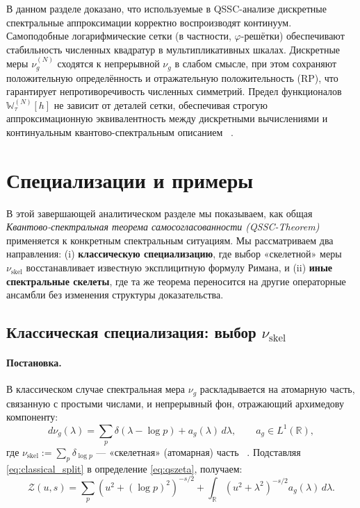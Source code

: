 \documentclass{article}
\numberwithin{equation}{section}
\theoremstyle{plain}
\theoremstyle{definition}
\theoremstyle{remark}
\def\delta{δ}\def\Delta{Δ}\def\epsilon{ε}\def\zeta{ζ}%
\begin{document}
В данном разделе доказано, что используемые в QSSC-анализе дискретные
спектральные аппроксимации корректно воспроизводят континуум.
Самоподобные логарифмические сетки (в частности, $\varphi$-решётки)
обеспечивают стабильность численных квадратур в мультипликативных шкалах.
Дискретные меры $\nu_g^{(N)}$ сходятся к непрерывной $\nu_g$
в слабом смысле, при этом сохраняют положительную определённость и отражательную положительность (RP),
что гарантирует непротиворечивость численных симметрий.
Предел функционалов $\mathbb W_\tau^{(N)}[h]$ не зависит от деталей сетки,
обеспечивая строгую аппроксимационную эквивалентность между дискретными вычислениями
и континуальным квантово-спектральным описанием ~\cite{Tikhonov1977}.

\clearpage

\section{Специализации и примеры}
\label{sec:specializations}

\noindent
В этой завершающей аналитическом разделе мы показываем,
как общая \emph{Квантово-спектральная теорема самосогласованности (QSSC-Theorem)}
применяется к конкретным спектральным ситуациям.
Мы рассматриваем два направления: (i) \textbf{классическую специализацию},
где выбор «скелетной» меры $\nu_{\mathrm{skel}}$ восстанавливает известную
эксплицитную формулу Римана, и (ii) \textbf{иные спектральные скелеты},
где та же теорема переносится на другие операторные ансамбли без изменения структуры доказательства.

\subsection{Классическая специализация: выбор $\nu_{\mathrm{skel}}$}
\label{subsec:classical_specialization}

\paragraph{Постановка.}
В классическом случае спектральная мера $\nu_g$
раскладывается на атомарную часть, связанную с простыми числами,
и непрерывный фон, отражающий архимедову компоненту:
\begin{equation}
\label{eq:classical_split}
d\nu_g(\lambda)
= \sum_p \delta(\lambda-\log p) + a_g(\lambda)\,d\lambda,
\qquad a_g\in L^1(\mathbb R),
\end{equation}
где $\nu_{\mathrm{skel}}:=\sum_p \delta_{\log p}$ --- «скелетная» (атомарная) часть ~\cite{BerryKeating1999}.
Подставляя \eqref{eq:classical_split} в определение \eqref{eq:qszeta}, получаем:
\begin{equation}
\label{eq:classical_Z}
\mathcal Z(u,s)
=\sum_p (u^2+(\log p)^2)^{-s/2} + \int_{\mathbb R} (u^2+\lambda^2)^{-s/2}a_g(\lambda)\,d\lambda.
\end{equation}
\end{document}
